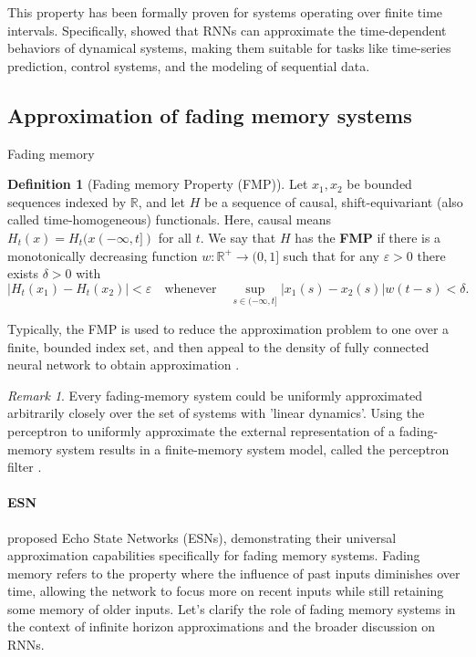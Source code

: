 \documentclass{article}
\theoremstyle{definition}
\newtheorem{definition}{Definition}
\theoremstyle{remark}
\newtheorem{remark}{Remark}
\begin{document}
This property has been formally proven for systems operating over finite time intervals. Specifically, \citet{funahashi1993approximation} showed that RNNs can approximate the time-dependent behaviors of dynamical systems, making them suitable for tasks like time-series prediction, control systems, and the modeling of sequential data.


\subsection{Approximation of fading memory systems}
Fading memory \citep{boyd1985fading}

\begin{definition}[Fading memory Property (FMP)]
Let $x_1, x_2$ be bounded sequences indexed by $\mathbb{R}$, and let $H$ be a sequence of causal, shift-equivariant (also called time-homogeneous) functionals.
Here, causal means $H_t(x) = H_t(x(-\infty,t])$ for all $t$.
We say that $H$ has the \textbf{FMP} if there is a monotonically decreasing function $w : \mathbb{R}^+ \to (0, 1]$ such that for any $\varepsilon > 0$ there exists $\delta > 0$ with 
\[
|H_t(x_1) - H_t(x_2)| < \varepsilon \quad \text{whenever} \quad \sup_{s \in (-\infty, t]} |x_1(s) - x_2(s)| w(t - s) < \delta.
\]
\end{definition}

 Typically, the FMP is used to reduce the approximation problem to one over a finite, bounded index set, and then appeal to the density of fully connected neural network to obtain approximation \citep{gonon2021fading}. %


\begin{remark}
Every fading-memory system could be uniformly approximated arbitrarily closely over the set of systems with 'linear dynamics'\citep{matthews1993approximating}. %
Using the perceptron to uniformly approximate the external representation of a fading-memory system results in a finite-memory system model, called the perceptron filter \citep{matthews1993approximating}.
\end{remark}
 

\paragraph{ESN}
 \citet{jaeger2001echo} proposed Echo State Networks (ESNs), demonstrating their universal approximation capabilities specifically for fading memory systems.
Fading memory refers to the property where the influence of past inputs diminishes over time, allowing the network to focus more on recent inputs while still retaining some memory of older inputs.
 Let’s clarify the role of fading memory systems in the context of infinite horizon approximations and the broader discussion on RNNs.
 
\end{document}
